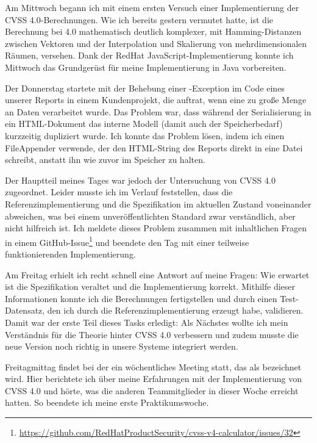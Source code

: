 \sweekdaymarginpar{\weekdayWednesdayLong}

Am Mittwoch begann ich mit einem ersten Versuch einer Implementierung der CVSS 4.0-Berechnungen.
Wie ich bereits gestern vermutet hatte, ist die Berechnung bei 4.0 mathematisch deutlich komplexer, mit Hamming-Distanzen zwischen Vektoren und der Interpolation und Skalierung von mehrdimensionalen Räumen, versehen.
Dank der RedHat JavaScript-Implementierung konnte ich Mittwoch das Grundgerüst für meine Implementierung in Java vorbereiten.

\sweekdaymarginpar{\weekdayThursdayLong}

Der Donnerstag startete mit der Behebung einer -Exception im Code eines unserer Reports in einem Kundenprojekt, die auftrat, wenn eine zu große Menge an Daten verarbeitet wurde.
Das Problem war, dass während der Serialisierung in ein HTML-Dokument das interne Modell (damit auch der Speicherbedarf) kurzzeitig dupliziert wurde.
Ich konnte das Problem lösen, indem ich einen FileAppender verwende, der den HTML-String des Reports direkt in eine Datei schreibt, anstatt ihn wie zuvor im Speicher zu halten.

Der Hauptteil meines Tages war jedoch der Untersuchung von CVSS 4.0 zugeordnet.
Leider musste ich im Verlauf feststellen, dass die Referenzimplementierung und die Spezifikation im aktuellen Zustand voneinander abweichen, was bei einem unveröffentlichten Standard zwar verständlich, aber nicht hilfreich ist.
Ich meldete dieses Problem zusammen mit inhaltlichen Fragen in einem GitHub-Issue\footnote{\url{https://github.com/RedHatProductSecurity/cvss-v4-calculator/issues/32}} und beendete den Tag mit einer teilweise funktionierenden Implementierung.

\sweekdaymarginpar{\weekdayFridayLong}

Am Freitag erhielt ich recht schnell eine Antwort auf meine Fragen:
Wie erwartet ist die Spezifikation veraltet und die Implementierung korrekt.
Mithilfe dieser Informationen konnte ich die Berechnungen fertigstellen und durch einen Test-Datensatz, den ich durch die Referenzimplementierung erzeugt habe, validieren.
Damit war der erste Teil dieses Tasks erledigt:
Als Nächstes wollte ich mein Verständnis für die Theorie hinter CVSS 4.0 verbessern und zudem musste die neue Version noch richtig in unsere Systeme integriert werden.

Freitagmittag findet bei der {\metaeffekt} ein wöchentliches Meeting statt, das als  bezeichnet wird.
Hier berichtete ich über meine Erfahrungen mit der Implementierung von CVSS 4.0 und hörte, was die anderen Teammitglieder in dieser Woche erreicht hatten.
So beendete ich meine erste Praktikumswoche.
